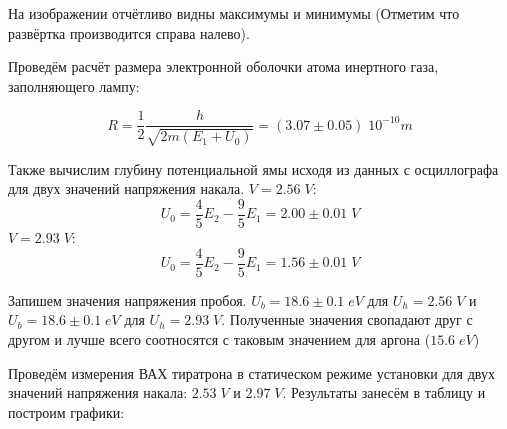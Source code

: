 \documentclass{article}
\begin{document}
На изображении отчётливо видны максимумы и минимумы (Отметим что развёртка производится
справа налево).

Проведём расчёт размера электронной оболочки атома инертного газа, заполняющего лампу:

\[ R = \frac{1}{2}\frac{h}{\sqrt{2m(E_1 + U_0)}} = (3.07 \pm 0.05)\;10^{-10}m  \]

Также вычислим глубину потенциальной ямы исходя из данных с осциллографа для двух значений
напряжения накала.
\(V = 2.56\;V\):
\[ U_0 = \frac{4}{5}E_2 - \frac{9}{5}E_1 = 2.00 \pm 0.01 \;V\]
\(V = 2.93\;V\):
\[ U_0 = \frac{4}{5}E_2 - \frac{9}{5}E_1 = 1.56 \pm 0.01\;V\]

Запишем значения напряжения пробоя. \(U_b = 18.6 \pm 0.1\;eV\) для \(U_h = 2.56\;V\) и
\(U_b = 18.6 \pm 0.1\;eV\) для \(U_h = 2.93\;V\). Полученные значения свопадают друг с другом
и лучше всего соотносятся с таковым значением для аргона (\(15.6\;eV\))

Проведём измерения ВАХ тиратрона в статическом режиме установки для двух значений
напряжения накала: \(2.53\;V\) и \(2.97\;V\). Результаты занесём в таблицу и построим графики:
\end{document}
